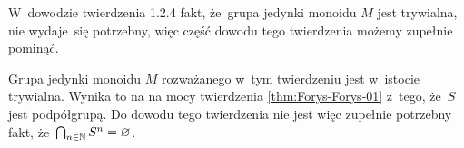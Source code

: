 \documentclass[a4paper,11pt]{article}
\begin{document}
\start {} W~dowodzie twierdzenia 1.2.4 fakt, że~grupa jedynki monoidu
$M$ jest trywialna, nie wydaje~się potrzebny, więc część dowodu tego
twierdzenia możemy zupełnie pominąć.

Grupa jedynki monoidu $M$ rozważanego w~tym twierdzeniu jest w~istocie
trywialna. Wynika to na na mocy twierdzenia \ref{thm:Forys-Forys-01}
z~tego, że~$S$ jest podpółgrupą. Do dowodu tego twierdzenia nie jest więc
zupełnie potrzebny fakt, że~$\bigcap_{ n \in \mathbb{N} } S^{ n } = \varnothing$.

\vspace{\spaceFour}





\start {}

























\newpage

\end{document}
